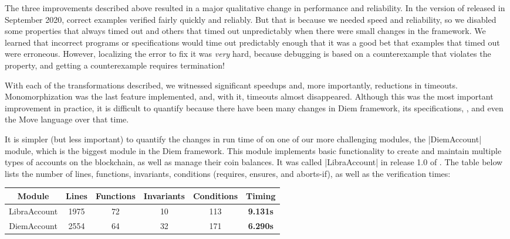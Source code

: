 

The three improvements described above resulted in a major qualitative
change in performance and reliability. In the version of \MVP released
in September 2020, correct examples verified fairly quickly and
reliably.  But that is because we needed speed and reliability, so we
disabled some properties that always timed out and others that timed
out unpredictably when there were small changes in the framework.  We
learned that incorrect programs or specifications would time out
predictably enough that it was a good bet that examples that timed out
were erroneous.  However, localizing the error to fix it was
\emph{very} hard, because debugging is based on a counterexample that
violates the property, and getting a counterexample requires
termination!

With each of the transformations described, we witnessed significant speedups
and, more importantly, reductions in timeouts.  Monomorphization was the last
feature implemented, and, with it, timeouts almost disappeared. Although this
was the most important improvement in practice, it is difficult to quantify
because there have been many changes in Diem framework, its specifications,
\MVP, and even the Move language over that time.

It is simpler (but less important) to quantify the changes in run time of \MVP
on one of our more challenging modules, the |DiemAccount| module, which is the
biggest module in the Diem framework. This module implements basic functionality
to create and maintain multiple types of accounts on the blockchain, as well as
manage their coin balances. It was called |LibraAccount| in release 1.0 of
\MVP. The table below lists the number of lines, functions, invariants,
conditions (requires, ensures, and aborts-if), as well as the verification
times:

{
\setlength{\tabcolsep}{6pt}
\vspace{2ex}
\begin{tabular*}{0.9\textwidth}{cccccc}
  \hline
  \hline
  Module & Lines & Functions & Invariants & Conditions & Timing \\
  \hline
  LibraAccount & 1975 & 72 & 10 & 113 & \textbf{9.131s} \\
  DiemAccount & 2554 & 64 & 32 & 171 & \textbf{6.290s} \\
  \hline
\end{tabular*}
\vspace{2ex}
}


